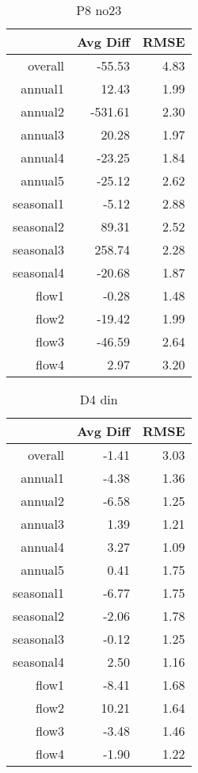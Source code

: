 \begin{table}[H]
\centering
\begin{tabular}{rrr}
  \hline
 & Avg Diff & RMSE \\ 
  \hline
overall & -55.53 & 4.83 \\ 
  annual1 & 12.43 & 1.99 \\ 
  annual2 & -531.61 & 2.30 \\ 
  annual3 & 20.28 & 1.97 \\ 
  annual4 & -23.25 & 1.84 \\ 
  annual5 & -25.12 & 2.62 \\ 
  seasonal1 & -5.12 & 2.88 \\ 
  seasonal2 & 89.31 & 2.52 \\ 
  seasonal3 & 258.74 & 2.28 \\ 
  seasonal4 & -20.68 & 1.87 \\ 
  flow1 & -0.28 & 1.48 \\ 
  flow2 & -19.42 & 1.99 \\ 
  flow3 & -46.59 & 2.64 \\ 
  flow4 & 2.97 & 3.20 \\ 
   \hline
\end{tabular}
\caption{P8 no23} 
\end{table}
\begin{table}[H]
\centering
\begin{tabular}{rrr}
  \hline
 & Avg Diff & RMSE \\ 
  \hline
overall & -1.41 & 3.03 \\ 
  annual1 & -4.38 & 1.36 \\ 
  annual2 & -6.58 & 1.25 \\ 
  annual3 & 1.39 & 1.21 \\ 
  annual4 & 3.27 & 1.09 \\ 
  annual5 & 0.41 & 1.75 \\ 
  seasonal1 & -6.77 & 1.75 \\ 
  seasonal2 & -2.06 & 1.78 \\ 
  seasonal3 & -0.12 & 1.25 \\ 
  seasonal4 & 2.50 & 1.16 \\ 
  flow1 & -8.41 & 1.68 \\ 
  flow2 & 10.21 & 1.64 \\ 
  flow3 & -3.48 & 1.46 \\ 
  flow4 & -1.90 & 1.22 \\ 
   \hline
\end{tabular}
\caption{D4 din} 
\end{table}
